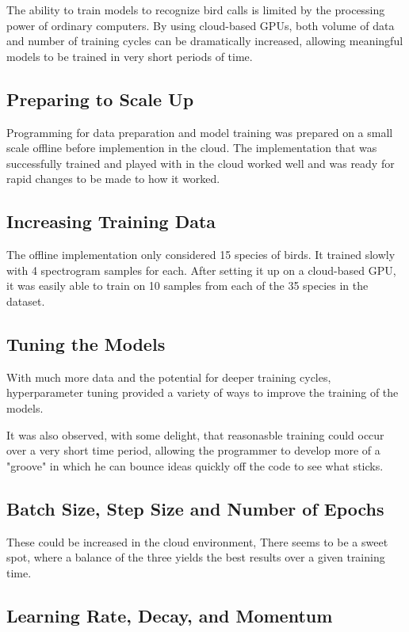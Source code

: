 \documentclass[sigconf]{acmart}
\begin{document}
The ability to train models to recognize bird calls is limited by the processing
power of ordinary computers. By using cloud-based GPUs, both volume of 
data and number of training cycles can be dramatically increased, allowing
meaningful models to be trained in very short periods of time.

\subsection{Preparing to Scale Up}

Programming for data preparation and model training was prepared on
a small scale offline before implemention in the cloud. The implementation
that was successfully trained and played with in the cloud worked well and
was ready for rapid changes to be made to how it worked.

\subsection{Increasing Training Data}

The offline implementation only considered 15 species of birds. It trained
slowly with 4 spectrogram samples for each. After setting it up on a cloud-based
GPU, it was easily able to train on 10 samples from each of the 35 species in the
dataset.

\subsection{Tuning the Models}

With much more data and the potential for deeper training cycles, hyperparameter
tuning provided a variety of ways to improve the training of the models.

It was also observed, with some delight, that reasonasble training could occur over
a very short time period, allowing the programmer to develop more of a "groove"
in which he can bounce ideas quickly off the code to see what sticks.

\subsection{Batch Size, Step Size and Number of Epochs}

These could be increased in the cloud environment, There seems to be a sweet
spot, where a balance of the three yields the best results over a given training time.

\subsection{Learning Rate, Decay, and Momentum}
\end{document}
